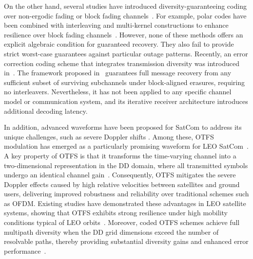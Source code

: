 \documentclass[journal]{IEEEtran}
\begin{document}
On the other hand, several studies have introduced diversity-guaranteeing coding over non-ergodic fading or block fading channels~\cite{Ju2022,5550477,6069883}. For example, polar codes have been combined with interleaving and multi-kernel constructions to enhance resilience over block fading channels~\cite{Ju2022,Niu2021,Mori2010}. However, none of these methods offers an explicit algebraic condition for guaranteed recovery. They also fail to provide strict worst-case guarantees against particular outage patterns. Recently, an error correction coding scheme that integrates transmission diversity was introduced in~\cite{Arikan2025_patent}. The framework proposed in~\cite{Arikan2025_patent} guarantees full message recovery from any sufficient subset of surviving subchannels under block-aligned erasures, requiring no interleavers. Nevertheless, it has not been applied to any specific channel model or communication system, and its iterative receiver architecture introduces additional decoding latency.

In addition, advanced waveforms have been proposed for SatCom to address its 
unique challenges, such as severe Doppler shifts \cite{11373535}. Among these, OTFS modulation 
has emerged as a particularly promising waveform for LEO SatCom~\cite{Shi2022, 
Ren2025, 9508932,11373535}. A key property of OTFS is that it transforms the time-varying 
channel into a two-dimensional representation in the DD domain, 
where all transmitted symbols undergo an identical channel gain~\cite{9904495}. Consequently, OTFS mitigates the severe Doppler effects caused by high relative velocities between satellites and ground users, delivering improved robustness and reliability over traditional schemes such as OFDM. 
Existing studies have demonstrated these advantages in LEO satellite systems, showing that OTFS exhibits strong resilience under high mobility conditions typical of LEO orbits~\cite{Shi2022, Shi2024_Network}. Moreover, coded OTFS schemes achieve full multipath diversity when the DD grid dimensions exceed the number of resolvable paths, thereby providing substantial diversity gains and enhanced error performance~\cite{Li2021}.
\end{document}
